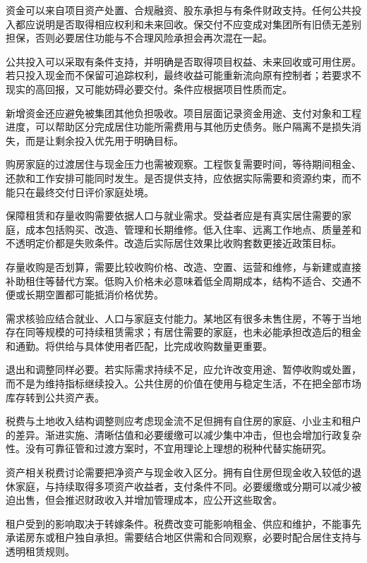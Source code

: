 \documentclass[UTF8,fontset=fandol,zihao=-4,oneside,openany]{ctexbook}
\begin{document}
资金可以来自项目资产处置、合规融资、股东承担与有条件财政支持。任何公共投入都应说明是否取得相应权利和未来回收。保交付不应变成对集团所有旧债无差别担保，否则必要居住功能与不合理风险承担会再次混在一起。

\label{arg:P267}
公共投入可以采取有条件支持，并明确是否取得项目权益、未来回收或可用住房。若只投入现金而不保留可追踪权利，最终收益可能重新流向原有控制者；若要求不现实的高回报，又可能妨碍必要交付。条件应根据项目性质而定。

新增资金还应避免被集团其他负担吸收。项目层面记录资金用途、支付对象和工程进度，可以帮助区分完成居住功能所需费用与其他历史债务。账户隔离不是损失消失，而是让剩余投入优先用于明确目标。

购房家庭的过渡居住与现金压力也需被观察。工程恢复需要时间，等待期间租金、还款和工作安排可能同时发生。是否提供支持，应依据实际需要和资源约束，而不能只在最终交付日评价家庭处境。

保障租赁和存量收购需要依据人口与就业需求。受益者应是有真实居住需要的家庭，成本包括购买、改造、管理和长期维修。低入住率、远离工作地点、质量差和不透明定价都是失败条件。改造后实际居住效果比收购套数更接近政策目标。

\label{arg:P268}
存量收购是否划算，需要比较收购价格、改造、空置、运营和维修，与新建或直接补助租住等替代方案。低购入价格未必意味着低全周期成本，结构不适合、交通不便或长期空置都可能抵消价格优势。

需求核验应结合就业、人口与家庭支付能力。某地区有很多未售住房，不等于当地存在同等规模的可持续租赁需求；有居住需要的家庭，也未必能承担改造后的租金和通勤。将供给与具体使用者匹配，比完成收购数量更重要。

退出和调整同样必要。若实际需求持续不足，应允许改变用途、暂停收购或处置，而不是为维持指标继续投入。公共住房的价值在使用与稳定生活，不在把全部市场库存转到公共资产表。

税费与土地收入结构调整则应考虑现金流不足但拥有自住房的家庭、小业主和租户的差异。渐进实施、清晰估值和必要缓缴可以减少集中冲击，但也会增加行政复杂性。没有可靠征管和过渡方案时，不宜用理论上理想的税种代替实施研究。

\label{arg:P269}
资产相关税费讨论需要把净资产与现金收入区分。拥有自住房但现金收入较低的退休家庭，与持续取得多项资产收益者，支付条件不同。必要缓缴或分期可以减少被迫出售，但会推迟财政收入并增加管理成本，应公开这些取舍。

租户受到的影响取决于转嫁条件。税费改变可能影响租金、供应和维护，不能事先承诺房东或租户独自承担。需要结合地区供需和合同观察，必要时配合居住支持与透明租赁规则。
\end{document}
